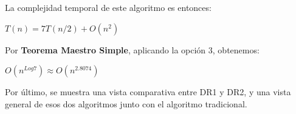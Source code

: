 \documentclass[12pt]{report}
\begin{document}
  La complejidad temporal de este algoritmo es entonces:

  \begin{center}
      $ T(n) = 7T(n/2) +  O(n^2) $
  \end{center}

  Por \textbf{Teorema Maestro Simple}, aplicando la opción 3, obtenemos:

  \begin{center}
    $ O(n^{Log7}) \approx O(n^{2.8074}) $
  \end{center}

  Por último, se muestra una vista comparativa entre DR1 y DR2, y una vista general de esos dos algoritmos junto con el algoritmo tradicional.

  \begin{center}
  \end{center}

  \begin{center}
  \end{center}
\end{document}
